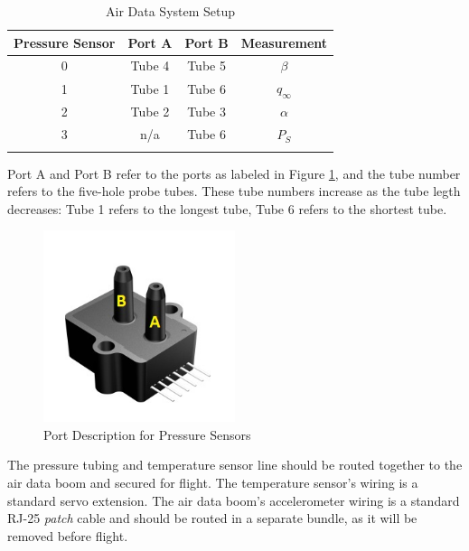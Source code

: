 \begin{table}[ht]
\caption{Air Data System Setup} %
\centering %
\begin{tabular}{c c c c} %
\hline\hline %
 Pressure Sensor & Port A & Port B & Measurement\\
\hline %
0 & Tube 4 & Tube 5 & $\beta$ \\
1 & Tube 1 & Tube 6 & $q_{\infty}$\\
2 & Tube 2 & Tube 3 & $\alpha$\\ 
3 & n/a & Tube 6 & $P_S$\\
\nomenclature[A]{$P_S$}{Static pressure}\\
\hline
\end{tabular}
\label{table:airDataSetup}
\end{table}
Port A and Port B refer to the ports as labeled in Figure \ref{fig:pressureLabels}, and the tube number refers to the five-hole probe tubes. These tube numbers increase as the tube legth decreases: Tube 1 refers to the longest tube, Tube 6 refers to the shortest tube.

\begin{figure}[H]
  \centering
    \includegraphics[width=0.5\textwidth]{figures/allsensorsPressureLabeled.jpg}
      \caption{Port Description for Pressure Sensors} \label{fig:pressureLabels}
\end{figure}

The pressure tubing and temperature sensor line should be routed together to the air data boom and secured for flight. The temperature sensor's wiring is a standard servo extension. The air data boom's accelerometer wiring is a standard RJ-25 \textit{patch} cable and should be routed in a separate bundle, as it will be removed before flight.

